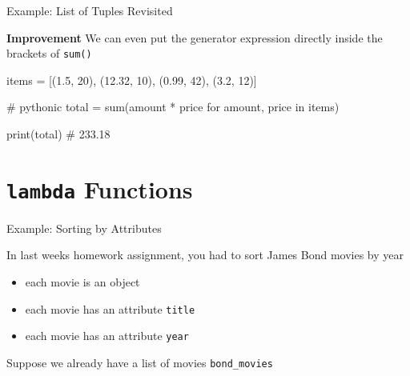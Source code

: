 \begin{frame}[fragile]{Example: List of Tuples Revisited}

    \begin{alertblock}{{\bf Improvement}}
        We can even put the generator expression directly inside the brackets of {\tt sum()}
    \end{alertblock}

    \vspace{1em}

    \begin{pythoncode}
items = [(1.5, 20), (12.32, 10), (0.99, 42), (3.2, 12)]

# pythonic
total = sum(amount * price for amount, price in items)

print(total)    # 233.18
    \end{pythoncode}


\end{frame}

\section{{\tt lambda} Functions}

\begin{frame}
    \sectionpage
\end{frame}

\begin{frame}{Example: Sorting by Attributes}

    In last weeks homework assignment, you had to sort James Bond movies by year

    \begin{itemize}
        \item each movie is an object
        \item each movie has an attribute {\tt title}
        \item each movie has an attribute {\tt year}
    \end{itemize}

    Suppose we already have a list of movies {\tt bond\_movies}

\end{frame}

